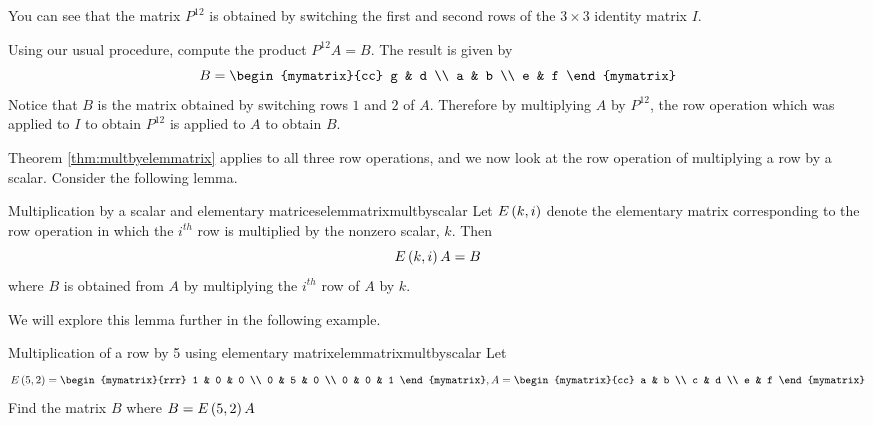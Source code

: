 \begin{solution}
You can see that the matrix $P^{12}$ is obtained by switching the first and second rows of the $3 \times 3$ identity matrix $I$.

Using our usual procedure, compute the product $P^{12}A = B$. The result is given by
\begin{equation*}
B =\begin{mymatrix}{cc}
g & d \\
a & b \\
e & f
\end{mymatrix}
\end{equation*}
Notice that $B$ is the matrix obtained by switching rows $1$ and $2$ of $A$. Therefore by  multiplying 
$A$ by $P^{12}$, the row operation which was applied to $I$ to obtain $P^{12}$ is applied to $A$ to obtain $B$. 
\end{solution}

Theorem \ref{thm:multbyelemmatrix} applies to all three row operations, and we now 
look at the row operation of multiplying a row by a scalar.  Consider the following lemma.

\begin{lemma}{Multiplication by a scalar and elementary matrices}{elemmatrixmultbyscalar}
Let $E\left(k,i\right) $ denote the elementary matrix
corresponding to the row operation in which the $i^{th}$ row is multiplied
by the nonzero scalar, $k.$  Then
\begin{equation*}
E\left(k,i\right) A=B
\end{equation*}
where $B$ is obtained from $A$ by multiplying the $i^{th}$ row of $A$ by $k$.
\end{lemma}

We will explore this lemma further in the following example.

\begin{example}{Multiplication of a row by 5 using elementary matrix}{elemmatrixmultbyscalar}
Let
\begin{equation*}
E \tup{5, 2} = \begin{mymatrix}{rrr}
1 & 0 & 0 \\
0 & 5 & 0 \\
0 & 0 & 1
\end{mymatrix}, A =  \begin{mymatrix}{cc}
a & b \\
c & d \\
e & f
\end{mymatrix}
\end{equation*}
Find the matrix $B$ where $B = E \left(5, 2\right)A$
\end{example}

